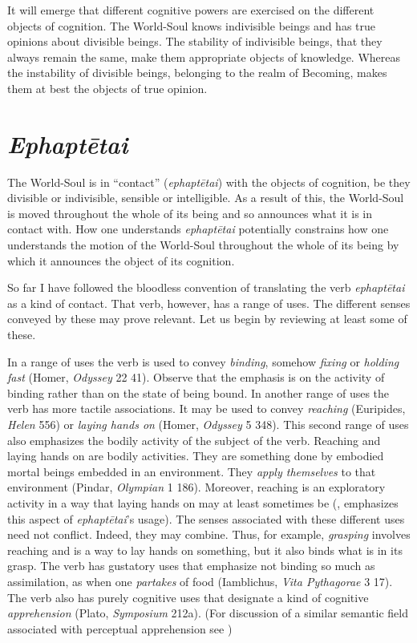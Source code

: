 It will emerge that different cognitive powers are exercised on the different objects of cognition. The World-Soul knows indivisible beings and has true opinions about divisible beings. The stability of indivisible beings, that they always remain the same, make them appropriate objects of knowledge. Whereas the instability of divisible beings, belonging to the realm of Becoming, makes them at best the objects of true opinion.


\section{\emph{Ephaptētai}} %
\label{sec:_emph_ephatetai}

The World-Soul is in ``contact'' (\emph{ephaptētai}) with the objects of cognition, be they divisible or indivisible, sensible or intelligible. As a result of this, the World-Soul is moved throughout the whole of its being and so announces what it is in contact with. How one understands \emph{ephaptētai} potentially constrains how one understands the motion of the World-Soul throughout the whole of its being by which it announces the object of its cognition. 

So far I have followed the bloodless convention of translating the verb \emph{ephaptētai} as a kind of contact. That verb, however, has a range of uses. The different senses conveyed by these may prove relevant. Let us begin by reviewing at least some of these.

In a range of uses the verb is used to convey \emph{binding}, somehow \emph{fixing} or \emph{holding fast} (Homer, \emph{Odyssey} 22 41). Observe that the emphasis is on the activity of binding rather than on the state of being bound. In another range of uses the verb has more tactile associations. It may be used to convey \emph{reaching} (Euripides, \emph{Helen} 556) or \emph{laying hands on} (Homer, \emph{Odyssey} 5 348). This second range of uses also emphasizes the bodily activity of the subject of the verb. Reaching and laying hands on are bodily activities. They are something done by embodied mortal beings embedded in an environment. They \emph{apply themselves} to that environment (Pindar, \emph{Olympian} 1 186). Moreover, reaching is an exploratory activity in a way that laying hands on may at least sometimes be (\citealt[134]{Betegh:2019fq}, emphasizes this aspect of \emph{ephaptētai}'s usage). The senses associated with these different uses need not conflict. Indeed, they may combine. Thus, for example, \emph{grasping} involves reaching and is a way to lay hands on something, but it also binds what is in its grasp. The verb has gustatory uses that emphasize not binding so much as assimilation, as when one \emph{partakes} of food (Iamblichus, \emph{Vita Pythagorae} 3 17). The verb also has purely cognitive uses that designate a kind of cognitive \emph{apprehension} (Plato, \emph{Symposium} 212a). (For discussion of a similar semantic field associated with perceptual apprehension see \citealt[chapters 1--2]{Kalderon:2018oe})

